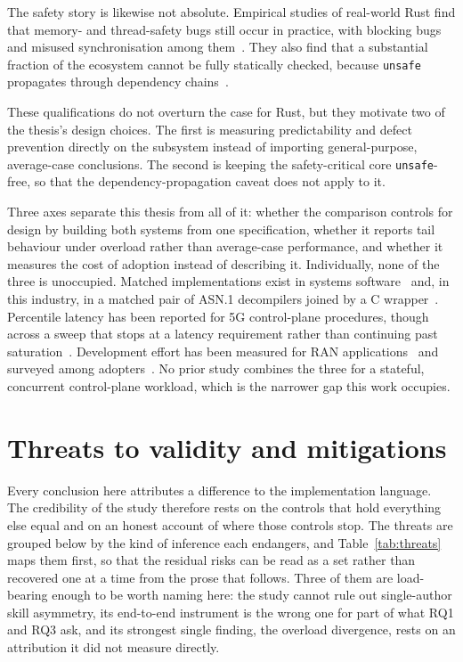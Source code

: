 \documentclass[english,twoside,openright,a4paper,censored,csm,software-track-2020]{HYthesisML}
\begin{document}
The safety story is likewise not absolute. Empirical studies of real-world Rust find that memory-
and thread-safety bugs still occur in practice, with blocking bugs and misused synchronisation
among them~\cite{qin2020rust,qin2024safety}. They also find that a substantial fraction of the
ecosystem cannot be fully statically checked, because \texttt{unsafe} propagates through
dependency chains~\cite{evans2020rust}.

These qualifications do not overturn the case for Rust, but they motivate two of the thesis's
design choices. The first is measuring predictability and defect prevention directly on the
subsystem instead of importing general-purpose, average-case conclusions. The second is keeping
the safety-critical core \texttt{unsafe}-free, so that the dependency-propagation caveat does not
apply to it.

Three axes separate this thesis from all of it: whether the comparison controls for design by
building both systems from one specification, whether it reports tail behaviour under overload
rather than average-case performance, and whether it measures the cost of adoption instead of
describing it. Individually, none of the three is unoccupied. Matched implementations exist in
systems
software~\cite{emmerich2019drivers,li2021ipc,narayanan2020redleaf,suchert2023stamp,gonzalez2023rustudp,pirelli2023safelowlevel}
and, in this industry, in a matched pair of ASN.1 decompilers joined by a C
wrapper~\cite{emberg2023asn1}. Percentile latency has been reported for 5G control-plane
procedures, though across a sweep that stops at a latency requirement rather than continuing past
saturation~\cite{arvidsson2025async}. Development effort has been measured for RAN
applications~\cite{karlback2021ran} and surveyed among adopters~\cite{fulton2021adopting}. No
prior study combines the three for a stateful, concurrent control-plane workload, which is the
narrower gap this work occupies.

\section{Threats to validity and mitigations}\label{sec:threats}
Every conclusion here attributes a difference to the implementation language. The
credibility of the study therefore rests on the controls that hold everything else equal and on an
honest account of where those controls stop. The threats are grouped below by the kind of
inference each endangers, and Table~\ref{tab:threats} maps them first, so that the residual
risks can be read as a set rather than recovered one at a time from the prose that follows.
Three of them are load-bearing enough to be worth naming here: the study cannot rule out
single-author skill asymmetry, its end-to-end instrument is the wrong one for part of what
RQ1 and RQ3 ask, and its strongest single finding, the overload divergence, rests on an
attribution it did not measure directly.
\end{document}
